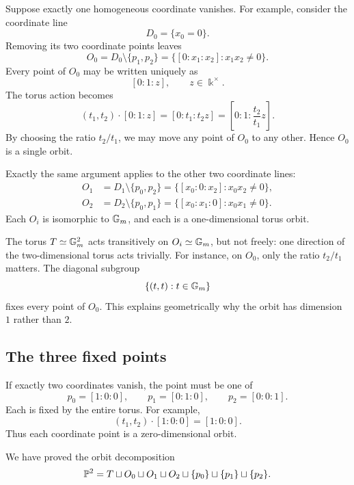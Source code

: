 Suppose exactly one homogeneous coordinate vanishes. For example,
consider the coordinate line
\[
D_0=\{x_0=0\}.
\]
Removing its two coordinate points leaves
\[
O_0
=
D_0\setminus\{p_1,p_2\}
=
\{[0:x_1:x_2]:x_1x_2\neq0\}.
\]
Every point of \(O_0\) may be written uniquely as
\[
[0:1:z],
\qquad
z\in\Bbbk^\times.
\]
The torus action becomes
\[
(t_1,t_2)\cdot[0:1:z]
=
[0:t_1:t_2z]
=
\left[0:1:\frac{t_2}{t_1}z\right].
\]
By choosing the ratio \(t_2/t_1\), we may move any point of \(O_0\)
to any other. Hence \(O_0\) is a single orbit.

Exactly the same argument applies to the other two coordinate lines:
\[
\begin{aligned}
O_1
&=
D_1\setminus\{p_0,p_2\}
=
\{[x_0:0:x_2]:x_0x_2\neq0\},
\\
O_2
&=
D_2\setminus\{p_0,p_1\}
=
\{[x_0:x_1:0]:x_0x_1\neq0\}.
\end{aligned}
\]
Each \(O_i\) is isomorphic to \(\mathbb{G}_{m}\), and each is a
one-dimensional torus orbit.

\begin{observation}
The torus \(T\simeq\mathbb{G}_{m}^2\) acts transitively on \(O_i\simeq\mathbb{G}_{m}\), but
not freely: one direction of the two-dimensional torus acts
trivially. For instance, on \(O_0\), only the ratio \(t_2/t_1\)
matters. The diagonal subgroup
\[
\{(t,t):t\in\mathbb{G}_{m}\}
\]
fixes every point of \(O_0\). This explains geometrically why the
orbit has dimension \(1\) rather than \(2\).
\end{observation}

\subsection{The three fixed points}

If exactly two coordinates vanish, the point must be one of
\[
p_0=[1:0:0],
\qquad
p_1=[0:1:0],
\qquad
p_2=[0:0:1].
\]
Each is fixed by the entire torus. For example,
\[
(t_1,t_2)\cdot[1:0:0]
=
[1:0:0].
\]
Thus each coordinate point is a zero-dimensional orbit.

We have proved the orbit decomposition
\[
\mathbb{P}^2
=
T
\sqcup O_0\sqcup O_1\sqcup O_2
\sqcup\{p_0\}\sqcup\{p_1\}\sqcup\{p_2\}.
\]

